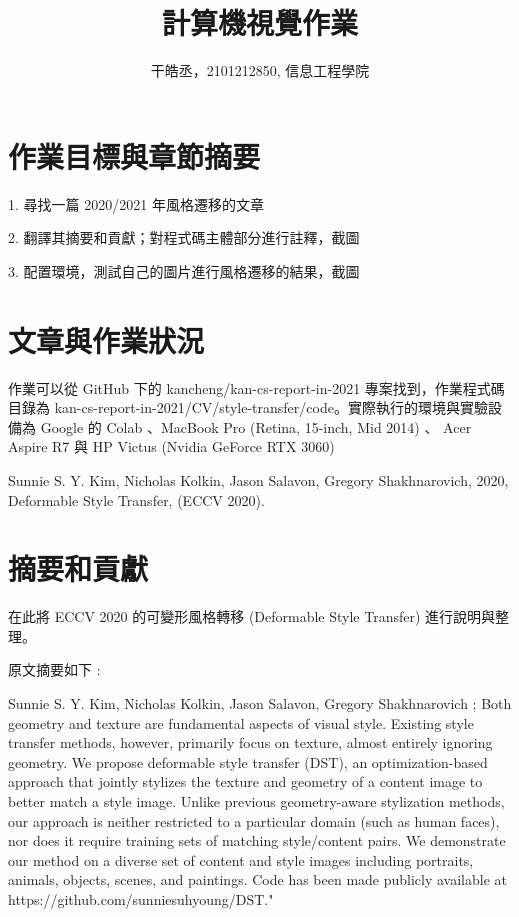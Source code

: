 \documentclass[10pt,UTF8]{ctexart}
\title{計算機視覺作業}
\author{干皓丞，2101212850, 信息工程學院}
\begin{document}
\maketitle


\section{作業目標與章節摘要}

1. 尋找一篇 2020/2021 年風格遷移的文章

2. 翻譯其摘要和貢獻；對程式碼主體部分進行註釋，截圖

3. 配置環境，測試自己的圖片進行風格遷移的結果，截圖

\section{文章與作業狀況}

作業可以從 GitHub 下的 kancheng/kan-cs-report-in-2021 專案找到，作業程式碼目錄為 kan-cs-report-in-2021/CV/style-transfer/code。實際執行的環境與實驗設備為 Google 的 Colab 、MacBook Pro (Retina, 15-inch, Mid 2014) 、 Acer Aspire R7 與 HP Victus (Nvidia GeForce RTX 3060)

Sunnie S. Y. Kim, Nicholas Kolkin, Jason Salavon, Gregory Shakhnarovich, 2020, Deformable Style Transfer, (ECCV 2020).

\section{摘要和貢獻}

在此將 ECCV 2020 的可變形風格轉移 (Deformable Style Transfer) 進行說明與整理。

原文摘要如下 :

Sunnie S. Y. Kim, Nicholas Kolkin, Jason Salavon, Gregory Shakhnarovich ;
Both geometry and texture are fundamental aspects of visual style. Existing style transfer methods, however, primarily focus on texture, almost entirely ignoring geometry. We propose deformable style transfer (DST), an optimization-based approach that jointly stylizes the texture and geometry of a content image to better match a style image. Unlike previous geometry-aware stylization methods, our approach is neither restricted to a particular domain (such as human faces), nor does it require training sets of matching style/content pairs. 
We demonstrate our method on a diverse set of content and style images including portraits, animals, objects, scenes, and paintings. Code has been made publicly available at https://github.com/sunniesuhyoung/DST."
\end{document}
